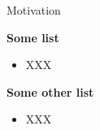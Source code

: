  \begin{frame}[c]{Motivation}
    
  {\bf  Some list}
   \begin{itemize}
  \item  XXX
\end{itemize}
    
\vspace{1cm}

{\bf Some other list}
    \begin{itemize}
  \item  XXX
\end{itemize}

 \end{frame}